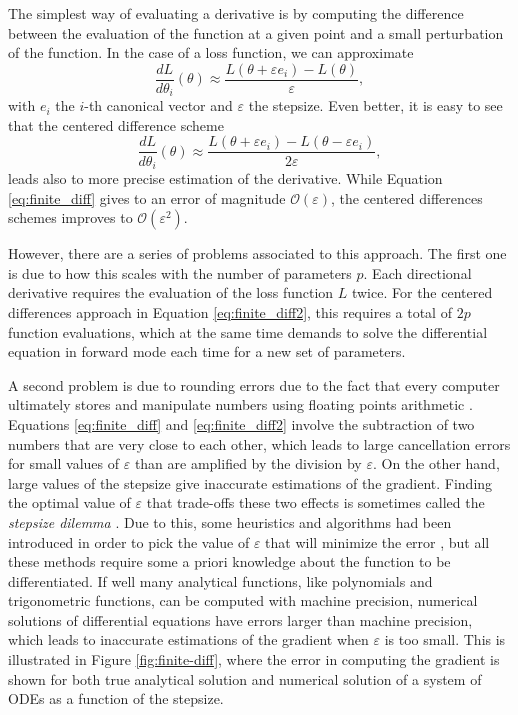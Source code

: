 The simplest way of evaluating a derivative is by computing the difference between the evaluation of the function at a given point and a small perturbation of the function. 
In the case of a loss function, we can approximate
\begin{equation}
 \frac{dL}{d\theta_i} (\theta) \approx \frac{L(\theta + \varepsilon e_i ) - L(\theta)}{\varepsilon},
 \label{eq:finite_diff}
\end{equation}
with $e_i$ the $i$-th canonical vector and $\varepsilon$ the stepsize. 
Even better, it is easy to see that the centered difference scheme
\begin{equation}
 \frac{dL}{d\theta_i} (\theta) \approx \frac{L(\theta + \varepsilon e_i ) - L(\theta - \varepsilon e_i)}{2\varepsilon},
 \label{eq:finite_diff2}
\end{equation}
leads also to more precise estimation of the derivative. 
While Equation \eqref{eq:finite_diff} gives to an error of magnitude $\mathcal O (\varepsilon)$, the centered differences schemes improves to $\mathcal O (\varepsilon^2)$. 
 
However, there are a series of problems associated to this approach.
The first one is due to how this scales with the number of parameters $p$.
Each directional derivative requires the evaluation of the loss function $L$ twice.
For the centered differences approach in Equation \eqref{eq:finite_diff2}, this requires a total of $2p$ function evaluations, which at the same time demands to solve the differential equation in forward mode each time for a new set of parameters.

A second problem is due to rounding errors due to the fact that every computer ultimately stores and manipulate numbers using floating points arithmetic \cite{Goldberg_1991_floatingpoint}. 
Equations \eqref{eq:finite_diff} and \eqref{eq:finite_diff2} involve the subtraction of two numbers that are very close to each other, which leads to large cancellation errors for small values of $\varepsilon$ than are amplified by the division by $\varepsilon$.
On the other hand, large values of the stepsize give inaccurate estimations of the gradient. 
Finding the optimal value of $\varepsilon$ that trade-offs these two effects is sometimes called the \textit{stepsize dilemma} \cite{mathur2012stepsize-finitediff}.
Due to this, some heuristics and algorithms had been introduced in order to pick the value of $\varepsilon$ that will minimize the error \cite{BARTON_1992_finite_diff, mathur2012stepsize-finitediff}, but all these methods require some a priori knowledge about the function to be differentiated. 
If well many analytical functions, like polynomials and trigonometric functions, can be computed with machine precision, numerical solutions of differential equations have errors larger than machine precision, which leads to inaccurate estimations of the gradient when $\varepsilon$ is too small. 
This is illustrated in Figure \ref{fig:finite-diff}, where the error in computing the gradient is shown for both true analytical solution and numerical solution of a system of ODEs as a function of the stepsize.

